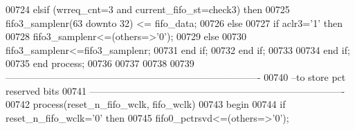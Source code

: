 \begin{DoxyCode}
00724           \textcolor{keywordflow}{elsif} \textcolor{vhdlchar}{(}\textcolor{vhdlchar}{wrreq_cnt}\textcolor{vhdlchar}{=}\textcolor{vhdllogic}{}\textcolor{vhdllogic}{3} \textcolor{keywordflow}{and} \textcolor{vhdlchar}{current_fifo_st}\textcolor{vhdlchar}{=}\textcolor{vhdlchar}{check3}\textcolor{vhdlchar}{)} \textcolor{keywordflow}{then}
00725             \textcolor{vhdlchar}{fifo3_samplenr}\textcolor{vhdlchar}{(}\textcolor{vhdllogic}{}\textcolor{vhdllogic}{63} \textcolor{keywordflow}{downto} \textcolor{vhdllogic}{}\textcolor{vhdllogic}{32}\textcolor{vhdlchar}{)} \textcolor{vhdlchar}{<=} \textcolor{vhdlchar}{fifo_data}; 
00726           \textcolor{keywordflow}{else}
00727             \textcolor{keywordflow}{if} \textcolor{vhdlchar}{aclr3}\textcolor{vhdlchar}{=}\textcolor{vhdlchar}{'}\textcolor{vhdllogic}{}\textcolor{vhdllogic}{1}\textcolor{vhdlchar}{'} \textcolor{keywordflow}{then} 
00728               \textcolor{vhdlchar}{fifo3_samplenr}\textcolor{vhdlchar}{<=}\textcolor{vhdlchar}{(}\textcolor{keywordflow}{others}\textcolor{vhdlchar}{=}\textcolor{vhdlchar}{>}\textcolor{vhdlchar}{'}\textcolor{vhdllogic}{}\textcolor{vhdllogic}{0}\textcolor{vhdlchar}{'}\textcolor{vhdlchar}{)};
00729             \textcolor{keywordflow}{else}  
00730               \textcolor{vhdlchar}{fifo3_samplenr}\textcolor{vhdlchar}{<=}\textcolor{vhdlchar}{fifo3_samplenr};
00731             \textcolor{keywordflow}{end} \textcolor{keywordflow}{if};
00732           \textcolor{keywordflow}{end} \textcolor{keywordflow}{if};           
00733 
00734         \textcolor{keywordflow}{end} \textcolor{keywordflow}{if};
00735     \textcolor{keywordflow}{end} \textcolor{keywordflow}{process};
00736      
00737       
00738       
00739 \textcolor{keyword}{-------------------------------------------------------------------------------    }
00740 \textcolor{keyword}{--to store pct reserved bits}
00741 \textcolor{keyword}{-------------------------------------------------------------------------------}
00742   \textcolor{keywordflow}{process}(reset_n_fifo_wclk, fifo_wclk)
00743 \textcolor{vhdlkeyword}{    begin}
00744       \textcolor{keywordflow}{if} \textcolor{vhdlchar}{reset_n_fifo_wclk}\textcolor{vhdlchar}{=}\textcolor{vhdlchar}{'}\textcolor{vhdllogic}{}\textcolor{vhdllogic}{0}\textcolor{vhdlchar}{'} \textcolor{keywordflow}{then}
00745         \textcolor{vhdlchar}{fifo0_pctrsvd}\textcolor{vhdlchar}{<=}\textcolor{vhdlchar}{(}\textcolor{keywordflow}{others}\textcolor{vhdlchar}{=}\textcolor{vhdlchar}{>}\textcolor{vhdlchar}{'}\textcolor{vhdllogic}{}\textcolor{vhdllogic}{0}\textcolor{vhdlchar}{'}\textcolor{vhdlchar}{)};

\end{DoxyCode}
